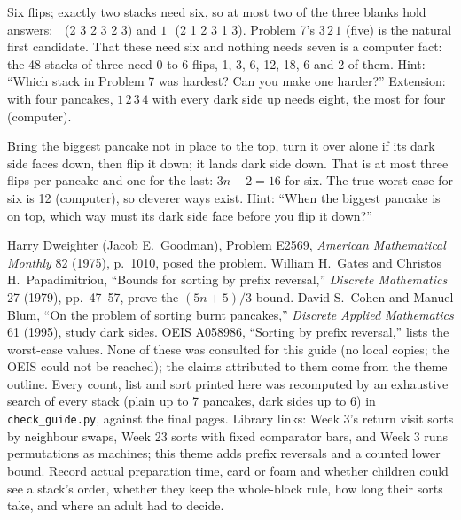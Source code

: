 Six flips; exactly two stacks need six, so at most two of the three blanks hold answers: \,\, (2 3 2 3 2 3) and $1$\,\, (2 1 2 3 1 3). Problem 7's $3\,2\,1$ (five) is the natural first candidate. That these need six and nothing needs seven is a computer fact: the 48 stacks of three need 0 to 6 flips, 1, 3, 6, 12, 18, 6 and 2 of them. Hint: ``Which stack in Problem 7 was hardest? Can you make one harder?'' Extension: with four pancakes, $1\,2\,3\,4$ with every dark side up needs eight, the most for four (computer).

Bring the biggest pancake not in place to the top, turn it over alone if its dark side faces down, then flip it down; it lands dark side down. That is at most three flips per pancake and one for the last: $3n-2=16$ for six. The true worst case for six is 12 (computer), so cleverer ways exist. Hint: ``When the biggest pancake is on top, which way must its dark side face before you flip it down?''

Harry Dweighter (Jacob E.\ Goodman), Problem E2569, \emph{American Mathematical Monthly} 82 (1975), p.\ 1010, posed the problem. William H.\ Gates and Christos H.\ Papadimitriou, ``Bounds for sorting by prefix reversal,'' \emph{Discrete Mathematics} 27 (1979), pp.\ 47--57, prove the $(5n+5)/3$ bound. David S.\ Cohen and Manuel Blum, ``On the problem of sorting burnt pancakes,'' \emph{Discrete Applied Mathematics} 61 (1995), study dark sides. OEIS A058986, ``Sorting by prefix reversal,'' lists the worst-case values. None of these was consulted for this guide (no local copies; the OEIS could not be reached); the claims attributed to them come from the theme outline. Every count, list and sort printed here was recomputed by an exhaustive search of every stack (plain up to 7 pancakes, dark sides up to 6) in \texttt{check\_guide.py}, against the final pages. Library links: Week 3's return visit sorts by neighbour swaps, Week 23 sorts with fixed comparator bars, and Week 3 runs permutations as machines; this theme adds prefix reversals and a counted lower bound. Record actual preparation time, card or foam and whether children could see a stack's order, whether they keep the whole-block rule, how long their sorts take, and where an adult had to decide.
